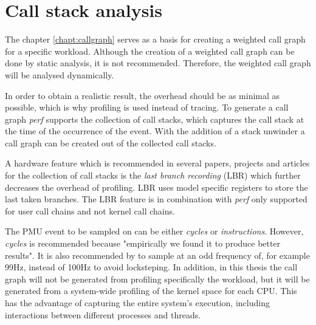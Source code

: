 \section{Call stack analysis}


The chapter \ref{chapt:callgraph} serves as a basis for creating a weighted call graph for a specific workload. Although the creation of a weighted call graph can be done by static analysis, it is not recommended. Therefore, the weighted call graph will be analysed dynamically.

In order to obtain a realistic result, the overhead should be as minimal as possible, which is why profiling is used instead of tracing. To generate a call graph \textit{perf} supports the collection of call stacks, which captures the call stack at the time of the occurrence of the event. With the addition of a stack unwinder a call graph can be created out of the collected call stacks. \cite[p. 62]{patmc} \cite{stack-unwinder} 

A hardware feature which is recommended in several papers, projects and articles for the collection of call stacks is the \textit{last branch recording} (LBR) which further decreases the overhead of profiling. \cite{codestitcher, bolt, propeller, lwn-lbr} LBR uses model specific registers to store the last taken branches. \cite{easyperf-lbr} \cite{lwn-lbr} The LBR feature is in combination with \textit{perf} only supported for user call chains and not kernel call chains. \cite{man-perf-record}

The PMU event to be sampled on can be either \textit{cycles} or \textit{instructions}. However, \textit{cycles} is recommended because "empirically we found it to produce better results". \cite{llvm-bolt} It is also recommended by \cite{brendan-perf} to sample at an odd frequency of, for example 99Hz, instead of 100Hz to avoid locksteping. In addition, in this thesis the call graph will not be generated from profiling specifically the workload, but it will be generated from a system-wide profiling of the kernel space for each CPU. This has the advantage of capturing the entire system's execution, including interactions between different processes and threads. 


